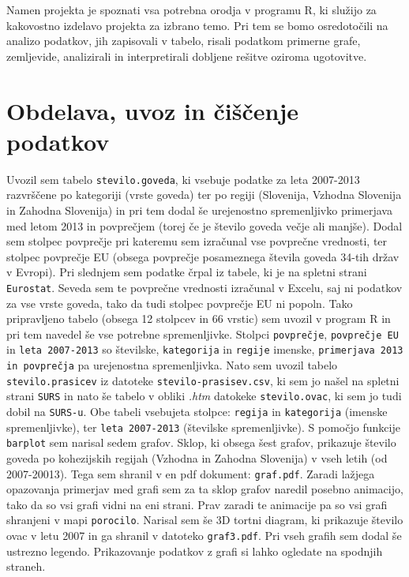 \documentclass[11pt,a4paper]{article}
\begin{document}
\noindent Namen projekta je spoznati vsa potrebna orodja v programu R, ki služijo za kakovostno izdelavo projekta za izbrano temo. Pri tem se bomo osredotočili na analizo podatkov, jih zapisovali v tabelo, risali podatkom primerne grafe, zemljevide, analizirali in interpretirali dobljene rešitve oziroma ugotovitve.

\section{Obdelava, uvoz in čiščenje podatkov}
Uvozil sem tabelo \verb|stevilo.goveda|, ki vsebuje podatke za leta 2007-2013 razvrščene po kategoriji (vrste goveda) ter po regiji (Slovenija, Vzhodna Slovenija in Zahodna Slovenija) in pri tem dodal še urejenostno spremenljivko primerjava med letom 2013 in povprečjem (torej če je število goveda večje ali manjše). Dodal sem stolpec povprečje pri kateremu sem izračunal vse povprečne vrednosti, ter stolpec povprečje EU (obsega povprečje posameznega števila goveda 34-tih držav v Evropi). Pri slednjem sem podatke črpal iz tabele, ki je na spletni strani \verb|Eurostat|. Seveda sem te povprečne vrednosti izračunal v Excelu, saj ni podatkov za vse vrste goveda, tako da tudi stolpec povprečje EU ni popoln. Tako pripravljeno tabelo (obsega 12 stolpcev in 66 vrstic) sem uvozil v program R in pri tem navedel še vse potrebne spremenljivke. Stolpci \verb|povprečje|, \verb|povprečje EU| in \verb|leta 2007-2013| so številske, \verb|kategorija| in \verb|regije| imenske, \verb|primerjava 2013 in povprečja| pa urejenostna spremenljivka.
Nato sem uvozil tabelo \verb|stevilo.prasicev| iz datoteke \verb|stevilo-prasisev.csv|, ki sem jo našel na spletni strani \verb|SURS| in nato še tabelo v obliki \textit{.htm} datokeke \verb|stevilo.ovac|, ki sem jo tudi dobil na \verb|SURS-u|. Obe tabeli vsebujeta stolpce: \verb|regija| in \verb|kategorija|  (imenske spremenljivke), ter \verb|leta 2007-2013| (številske spremenljivke).
\newline
S pomočjo funkcije \verb|barplot| sem narisal sedem grafov. Sklop, ki obsega šest grafov, prikazuje število goveda po kohezijskih regijah (Vzhodna in Zahodna Slovenija) v vseh letih (od 2007-20013). Tega sem shranil v en pdf dokument: \verb|graf.pdf|. Zaradi lažjega opazovanja primerjav med grafi sem za ta sklop grafov naredil posebno animacijo, tako da so vsi grafi vidni na eni strani. Prav zaradi te animacije pa so vsi grafi shranjeni v mapi \verb|porocilo|. Narisal sem še 3D tortni diagram, ki prikazuje število ovac v letu 2007 in ga shranil v datoteko \verb|graf3.pdf|. Pri vseh grafih sem dodal še ustrezno legendo. Prikazovanje podatkov z grafi si lahko ogledate na spodnjih straneh.
\end{document}

